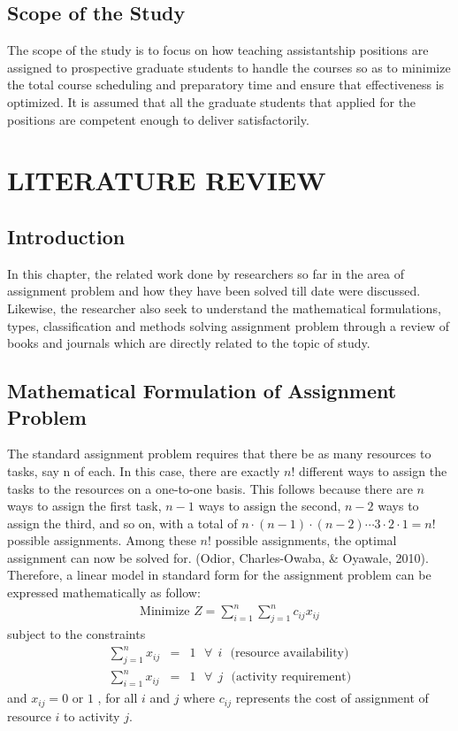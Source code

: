 \documentclass[11pt]{report}
\newcommand{\sps}{\\[0.2cm]}
\newcommand{\NI}{\noindent}
\begin{document}
	\section{Scope of the Study}
	The scope of the study is to focus on how teaching assistantship positions are assigned to prospective graduate students to handle the courses so as to minimize the total course scheduling and preparatory time and ensure that effectiveness is optimized. It is assumed that all the graduate students that applied for the positions are competent enough to deliver satisfactorily.
	
		
	\chapter{LITERATURE REVIEW}
	\section{Introduction}
	In this chapter, the related work done by researchers so far in the area of assignment problem and how they have been solved till date were discussed. Likewise, the researcher also seek to understand the mathematical formulations, types, classification and methods solving assignment problem through a review of books and journals which are directly related to the topic of study.
	
	\section{Mathematical Formulation of Assignment Problem}
	The standard assignment problem requires that there be as many resources to tasks, say n of each. In this case, there are exactly $n!$ different ways to assign the tasks to the resources on a one-to-one basis. This follows because there are $n$ ways to assign the first task, $n-1$ ways to assign the second, $n-2$ ways to assign the third, and so on, with a total of $n \cdot (n-1) \cdot (n-2) \cdots 3 \cdot 2 \cdot 1 = n!$ possible assignments. Among these $n!$ possible assignments, the optimal assignment can now be solved for.
	(Odior, Charles-Owaba, \& Oyawale, 2010).\\
	
	\NI Therefore, a linear model in standard form for the assignment problem can be expressed mathematically as follow:
	\begin{eqnarray}
		\text{Minimize } Z = \sum_{i=1}^{n}\sum_{j=1}^{n}c_{ij}x_{ij}
	\end{eqnarray}
	subject to the constraints
	\begin{eqnarray}
		\sum_{j=1}^{n}x_{ij} &=& 1 ~~~\forall ~~i ~~~\text{(resource availability)}\sps
		\sum_{i=1}^{n}x_{ij} &=& 1 ~~~\forall ~~j ~~~\text{(activity requirement)}
	\end{eqnarray}
	and $x_{ij} = 0$ or $1$ , for all $i$ and $j$ where $c_{ij}$ represents the cost of assignment of resource $i$ to activity $j$.\\
	
\end{document}
